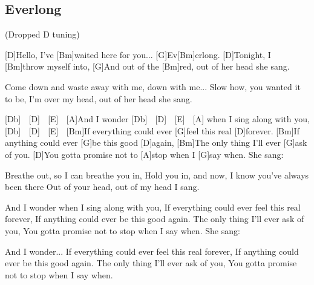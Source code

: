 \subsection*{Everlong   }
\begin{guitar}
(Dropped D tuning)

[D]Hello, I've [Bm]waited here for you... [G]Ev[Bm]erlong.
[D]Tonight, I [Bm]throw myself into,
[G]And out of the [Bm]red, out of her head she sang.

Come down and waste away with me, down with me...
Slow how, you wanted it to be,
I'm over my head, out of her head she sang.

[Db] $\;$ [D] $\;$ [E] $\;$ [A]And I wonder [Db] $\;$ [D] $\;$ [E] $\;$ [A] when I sing along with you, [Db] $\;$ [D] $\;$ [E] $\;$
[Bm]If everything could ever [G]feel this real [D]forever.
[Bm]If anything could ever [G]be this good [D]again,
[Bm]The only thing I'll ever [G]ask of you.
[D]You gotta promise not to [A]stop when I [G]say when.
She sang:

Breathe out, so I can breathe you in,
Hold you in, and now, I know you've always been there
Out of your head, out of my head I sang.

And I wonder when I sing along with you,
If everything could ever feel this real forever,
If anything could ever be this good again.
The only thing I'll ever ask of you,
You gotta promise not to stop when I say when.
She sang:

And I wonder...
If everything could ever feel this real forever,
If anything could ever be this good again.
The only thing I'll ever ask of you,
You gotta promise not to stop when I say when.
\end{guitar}
